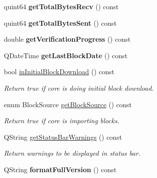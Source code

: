 \begin{DoxyCompactItemize}
quint64 {\bfseries get\+Total\+Bytes\+Recv} () const
\item 
\mbox{\label{class_client_model_a53cd536b119e49b0fab9c95d13a247ed}} 
quint64 {\bfseries get\+Total\+Bytes\+Sent} () const
\item 
\mbox{\label{class_client_model_a6eebc4f6b096e037cb49ca395a42789a}} 
double {\bfseries get\+Verification\+Progress} () const
\item 
\mbox{\label{class_client_model_a8683d6269976a006032075bc01be4925}} 
Q\+Date\+Time {\bfseries get\+Last\+Block\+Date} () const
\item 
\mbox{\label{class_client_model_af9798c364463ada09be477b15daf0fbe}} 
bool \mbox{\hyperlink{class_client_model_af9798c364463ada09be477b15daf0fbe}{in\+Initial\+Block\+Download}} () const
\begin{DoxyCompactList}\small\item\em Return true if core is doing initial block download. \end{DoxyCompactList}\item 
\mbox{\label{class_client_model_ab57c3a8365dd3f455f84521353facee7}} 
enum Block\+Source \mbox{\hyperlink{class_client_model_ab57c3a8365dd3f455f84521353facee7}{get\+Block\+Source}} () const
\begin{DoxyCompactList}\small\item\em Return true if core is importing blocks. \end{DoxyCompactList}\item 
\mbox{\label{class_client_model_a16718fa6c90ac5bce0ce1dcbfb3ec95c}} 
Q\+String \mbox{\hyperlink{class_client_model_a16718fa6c90ac5bce0ce1dcbfb3ec95c}{get\+Status\+Bar\+Warnings}} () const
\begin{DoxyCompactList}\small\item\em Return warnings to be displayed in status bar. \end{DoxyCompactList}\item 
\mbox{\label{class_client_model_ae9448d6f2a7f99467152b17f7044eb12}} 
Q\+String {\bfseries format\+Full\+Version} () const
\item 

\end{DoxyCompactItemize}
